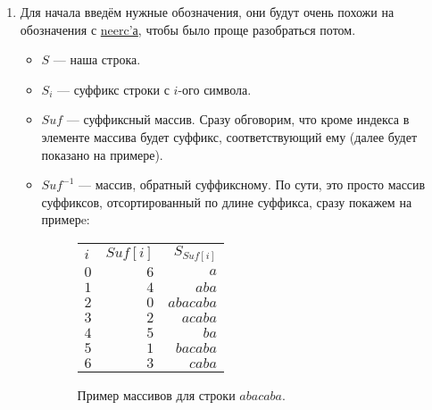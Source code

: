 \begin{enumerate}
        \item Для начала введём нужные обозначения, они будут очень похожи на обозначения с \href{https://neerc.ifmo.ru/wiki/index.php?title=%D0%90%D0%BB%D0%B3%D0%BE%D1%80%D0%B8%D1%82%D0%BC_%D0%9A%D0%B0%D1%81%D0%B0%D0%B8_%D0%B8_%D0%B4%D1%80.}{neerc'а}, чтобы было проще разобраться потом. 
        \begin{itemize}
                \item $S$ --- наша строка.
                \item $S_{i}$ --- суффикс строки с $i$-ого символа.
                \item $Suf$ --- суффиксный массив. Сразу обговорим, что кроме индекса в элементе массива
                будет суффикс, соответствующий ему (далее будет показано на примере).
                \item $Suf^{-1}$ --- массив, обратный суффиксному. По сути, это просто массив суффиксов,
                отсортированный по длине суффикса, сразу покажем на примерe:
                \begin{figure}[H]
                        \caption*{Пример массивов для строки $abacaba$.}
                        \centering
                        \begin{minipage}{.5\textwidth}
                                \centering
                                \begin{tabular}{lrr}
                                        $i$ & $Suf[i]$ & $S_{Suf[i]}$ \\
                                        $0$ & $6$ & $a$ \\
                                        $1$ & $4$ & $aba$ \\
                                        $2$ & $0$ & $abacaba$ \\
                                        $3$ & $2$ & $acaba$ \\
                                        $4$ & $5$ & $ba$ \\
                                        $5$ & $1$ & $bacaba$ \\
                                        $6$ & $3$ & $caba$ \\
                                \end{tabular} 


\end{minipage}
\end{figure}
\end{itemize}
\end{enumerate}
